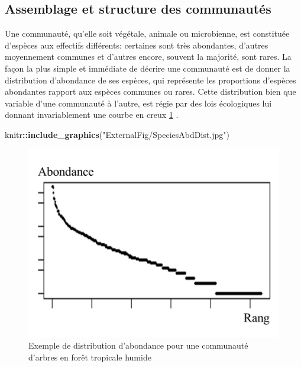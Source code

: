 \documentclass[
  11pt,
  french,
  A4paper,
  extrafontsizes,onecolumn,openright
  ]{memoir}
\newenvironment{Shaded}{\begin{snugshade}}{\end{snugshade}}
\newcommand{\KeywordTok}[1]{\textcolor[rgb]{0.13,0.29,0.53}{\textbf{#1}}}
\newcommand{\StringTok}[1]{\textcolor[rgb]{0.31,0.60,0.02}{#1}}
\newcommand{\OperatorTok}[1]{\textcolor[rgb]{0.81,0.36,0.00}{\textbf{#1}}}
\newcommand{\NormalTok}[1]{#1}
\begin{document}
\subsection{Assemblage et structure des
communautés}\label{AbundanceDistribution}

Une communauté, qu'elle soit végétale, animale ou microbienne, est
constituée d'espèces aux effectifs différents: certaines sont très
abondantes, d'autres moyennement communes et d'autres encore, souvent la
majorité, sont rares. La façon la plus simple et immédiate de décrire
une communauté est de donner la distribution d'abondance de ses espèces,
qui représente les proportions d'espèces abondantes rapport aux espèces
communes ou rares. Cette distribution bien que variable d'une communauté
à l'autre, est régie par des lois écologiques lui donnant invariablement
une courbe en creux \ref{fig:AbdDist} \autocite{McGill2007}.

\begin{Shaded}
\begin{Highlighting}[]
\NormalTok{knitr}\OperatorTok{::}\KeywordTok{include_graphics}\NormalTok{(}\StringTok{"ExternalFig/SpeciesAbdDist.jpg"}\NormalTok{)}
\end{Highlighting}
\end{Shaded}

\begin{figure}

{\centering \includegraphics[width=0.6\linewidth]{ExternalFig/SpeciesAbdDist} 

}

\caption{Exemple de distribution d'abondance pour une communauté d'arbres en forêt tropicale humide}\label{fig:AbdDist}
\end{figure}
\end{document}
